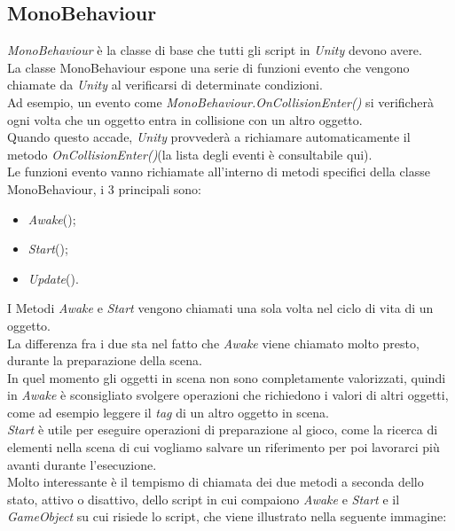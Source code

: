 \subsection{MonoBehaviour}
\textit{MonoBehaviour}\cite{Mono} è la classe di base che tutti gli script in \textit{Unity} devono avere.\\La classe MonoBehaviour espone una serie di funzioni evento che vengono chiamate da \textit{Unity} al verificarsi di determinate condizioni.
\\Ad esempio, un evento come \textit{MonoBehaviour.OnCollisionEnter()} si verificherà ogni volta che un oggetto entra in collisione con un altro oggetto.
\\Quando questo accade, \textit{Unity} provvederà a richiamare automaticamente il metodo \textit{OnCollisionEnter()}(la lista degli eventi è consultabile qui\cite{Eventi}).
\\Le funzioni evento vanno richiamate all'interno di metodi specifici della classe MonoBehaviour, i 3 principali sono:
\begin{itemize}
    \item \textit{Awake}();
    \item \textit{Start}();
    \item \textit{Update}().
\end{itemize}
I Metodi \textit{\textit{Awake}} e \textit{\textit{Start}} vengono chiamati una sola volta nel ciclo di vita di un oggetto. 
\\La differenza fra i due sta nel fatto che \textit{\textit{Awake}} viene chiamato molto presto, durante la preparazione della scena.
\\In quel momento gli oggetti in scena non sono completamente valorizzati, quindi in \textit{Awake} è sconsigliato svolgere operazioni che richiedono i valori di altri oggetti, come ad esempio leggere il \textit{tag} di un altro oggetto in scena.
\\\textit{\textit{Start}} è utile per eseguire operazioni di preparazione al gioco, come la ricerca di elementi nella scena di cui vogliamo salvare un riferimento per poi lavorarci più avanti durante l'esecuzione.
\\Molto interessante è il tempismo di chiamata dei due metodi a seconda dello stato, attivo o disattivo, dello script in cui compaiono \textit{Awake} e \textit{Start} e il \textit{GameObject} su cui risiede lo script, che viene illustrato nella seguente immagine:
